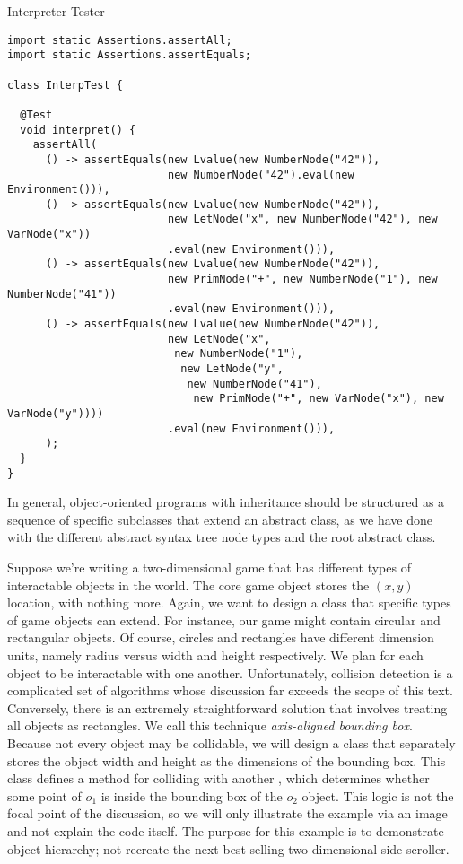 \begin{cl}{Interpreter Tester}
\begin{lstlisting}[language=MyJava]
import static Assertions.assertAll;
import static Assertions.assertEquals;
  
class InterpTest {
  
  @Test
  void interpret() {
    assertAll(
      () -> assertEquals(new Lvalue(new NumberNode("42")),
                         new NumberNode("42").eval(new Environment())),
      () -> assertEquals(new Lvalue(new NumberNode("42")),
                         new LetNode("x", new NumberNode("42"), new VarNode("x"))
                         .eval(new Environment())),
      () -> assertEquals(new Lvalue(new NumberNode("42")),
                         new PrimNode("+", new NumberNode("1"), new NumberNode("41"))
                         .eval(new Environment())),
      () -> assertEquals(new Lvalue(new NumberNode("42")),
                         new LetNode("x",
                          new NumberNode("1"),
                           new LetNode("y",
                            new NumberNode("41"),
                             new PrimNode("+", new VarNode("x"), new VarNode("y"))))
                         .eval(new Environment())),
      );
  }
}
\end{lstlisting}
\end{cl}

In general, object-oriented programs with inheritance should be structured as a sequence of specific subclasses that extend an abstract class, as we have done with the different abstract syntax tree node types and the root  abstract class. 

\example Suppose we're writing a two-dimensional game that has different types of interactable objects in the world. The core game object stores the $(x, y)$ location, with nothing more. Again, we want to design a class that specific types of game objects can extend. For instance, our game might contain circular and rectangular objects. Of course, circles and rectangles have different dimension units, namely radius versus width and height respectively. We plan for each object to be interactable with one another. Unfortunately, collision detection is a complicated set of algorithms whose discussion far exceeds the scope of this text. Conversely, there is an extremely straightforward solution that involves treating all objects as rectangles. We call this technique \textit{axis-aligned bounding box}. Because not every object may be collidable, we will design a class  that separately stores the object width and height as the dimensions of the bounding box. This class defines a method for colliding with another , which determines whether some point of $o_1$ is inside the bounding box of the $o_2$ object. This logic is not the focal point of the discussion, so we will only illustrate the example via an image and not explain the code itself. The purpose for this example is to demonstrate object hierarchy; not recreate the next best-selling two-dimensional side-scroller.


